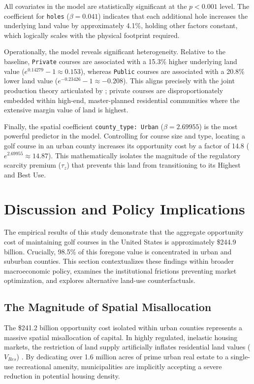 \documentclass[10pt, letterpaper]{article}
\begin{document}
All covariates in the model are statistically significant at the $p < 0.001$ level. The coefficient for \texttt{holes} ($\beta = 0.041$) indicates that each additional hole increases the underlying land value by approximately 4.1\%, holding other factors constant, which logically scales with the physical footprint required.

Operationally, the model reveals significant heterogeneity. Relative to the baseline, \texttt{Private} courses are associated with a 15.3\% higher underlying land value ($e^{0.14279} - 1 \approx 0.153$), whereas \texttt{Public} courses are associated with a 20.8\% lower land value ($e^{-0.23426} - 1 \approx -0.208$). This aligns precisely with the joint production theory articulated by \textcite{Limehouse2012}; private courses are disproportionately embedded within high-end, master-planned residential communities where the extensive margin value of land is highest.

Finally, the spatial coefficient \texttt{county\_type: Urban} ($\beta = 2.69955$) is the most powerful predictor in the model. Controlling for course size and type, locating a golf course in an urban county increases its opportunity cost by a factor of 14.8 ($e^{2.69955} \approx 14.87$). This mathematically isolates the magnitude of the regulatory scarcity premium ($\tau_z$) that prevents this land from transitioning to its Highest and Best Use.

\newpage

\section{Discussion and Policy Implications}

The empirical results of this study demonstrate that the aggregate opportunity cost of maintaining golf courses in the United States is approximately \$244.9 billion. Crucially, 98.5\% of this foregone value is concentrated in urban and suburban counties. This section contextualizes these findings within broader macroeconomic policy, examines the institutional frictions preventing market optimization, and explores alternative land-use counterfactuals.

\subsection{The Magnitude of Spatial Misallocation}
The \$241.2 billion opportunity cost isolated within urban counties represents a massive spatial misallocation of capital. In highly regulated, inelastic housing markets, the restriction of land supply artificially inflates residential land values ($V_{Res}$) \parencite{Glaeser2005, Davis2021}. By dedicating over 1.6 million acres of prime urban real estate to a single-use recreational amenity, municipalities are implicitly accepting a severe reduction in potential housing density. 
\end{document}

